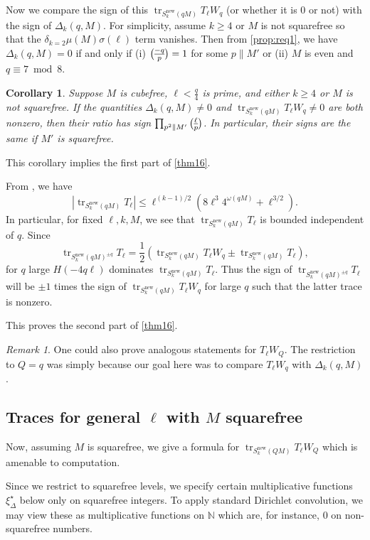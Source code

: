 \documentclass[11pt]{amsart}
\newcommand{\new}{\mathrm{new}}
\renewcommand{\mod}{\bmod}
\newcommand{\leg}{\overwithdelims ()}
\DeclareMathOperator{\tr}{tr}
\numberwithin{lem}{section}
\newtheorem{cor}[lem]{Corollary}
\theoremstyle{remark}
\newtheorem{rem}[lem]{Remark}
\theoremstyle{definition}
\numberwithin{equation}{section}
\begin{document}
Now we compare the sign of this $\tr_{S_k^\new(q M)} T_\ell W_q$ (or whether it is 0 or not) with the sign of $\Delta_k(q,M)$.
For simplicity, assume $k \ge 4$ or $M$ is not squarefree so that the
$\delta_{k=2} \mu(M) \sigma(\ell)$ term vanishes.  Then from 
\cref{prop:req1}, we have $\Delta_k(q,M) = 0$ if and only if (i) ${-q \leg p} = 1$ for some $p \parallel M'$ or (ii) $M$ is even and $q \equiv 7 \mod 8$.

\begin{cor} Suppose $M$ is cubefree, $\ell < \frac q4$ is prime, and either $k \ge 4$ or $M$ is not squarefree.  If the quantities $\Delta_k(q,M) \ne 0$ and
$\tr_{S_k^\new(q M)} T_\ell W_q \ne 0$ are both nonzero, then their ratio has sign $\prod_{p^2 \parallel M'} {\ell \leg p}$.  In particular, their signs are the same if $M'$ is squarefree. 
\end{cor}

This corollary implies the first part of \cref{thm16}.

From \cite[Proposition 14]{murty-sinha}, we have
\[ \left| \tr_{S_k^\new(qM)} T_\ell \right|  \le \ell^{(k-1)/2} \left( 8 \ell^3 4^{\omega(qM)} + \ell^{3/2} \right). \]
In particular, for fixed $\ell, k, M$, we see that $\tr_{S_k^\new(qM)} T_\ell$ is bounded independent of $q$.
Since 
\[ \tr_{S_k^\new(q M)^{\pm q}} T_\ell= \frac 12 \left( \tr_{S_k^\new(qM)}  T_\ell W_q \pm \tr_{S_k^\new(qM)} T_\ell \right), \] 
for $q$ large $H(-4 q \ell)$ dominates $\tr_{S_k^\new(qM)} T_\ell$.
Thus the sign of $\tr_{S_k^\new(q M)^{\pm q}} T_\ell$ will be $\pm 1$ times the sign of $\tr_{S_k^\new(q M)} T_\ell W_q$ for large $q$ such that the latter trace is nonzero.

This proves the second part of \cref{thm16}.

\begin{rem} One could also prove analogous statements for $T_\ell W_Q$.  The restriction to $Q=q$ was simply because our goal here was to compare $T_\ell W_q$ with $\Delta_k(q,M)$.
\end{rem}

\subsection{Traces for general $\ell$  with $M$ squarefree}

Now, assuming $M$ is squarefree, we give a formula for $\tr_{S_k^\new(QM)} T_\ell W_Q$ which is amenable to computation.

Since we restrict to squarefree levels, we specify certain multiplicative functions $\xi_\Delta^\star$ below only on squarefree integers.  To apply standard Dirichlet convolution, we may view these as multiplicative functions on $\mathbb N$ which are, for instance, 0 on non-squarefree numbers.
\end{document}
